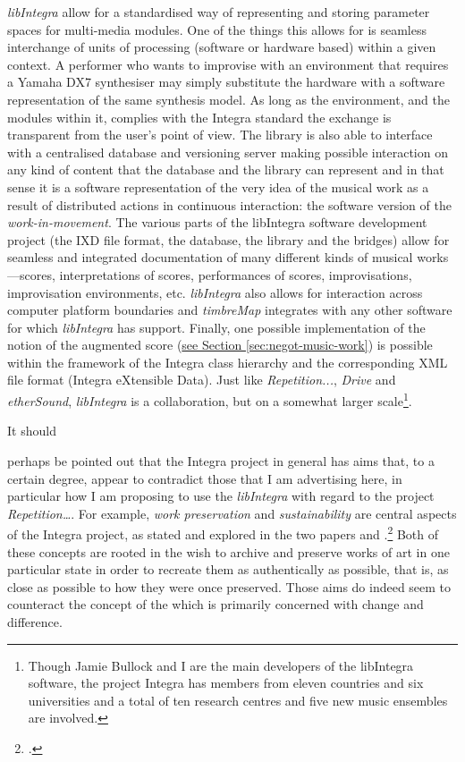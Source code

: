 \emph{libIntegra} allow for a standardised way of representing and storing parameter spaces for multi-media modules.  One of the things this allows for is seamless interchange of units of  processing (software or hardware based) within a given context. A performer who wants to improvise with an environment that requires a Yamaha DX7 synthesiser may simply substitute the hardware with a software representation of the same synthesis model. As long as the environment, and the modules within it, complies with the Integra standard the exchange is transparent from the user's point of view. The library is also able to interface with a centralised database and versioning server making possible interaction on any kind of content that the database and the library can represent and in that sense it is a software representation of the very idea of the musical work as a result of distributed actions in continuous interaction: the software version of the \emph{work-in-movement}. The various parts of the libIntegra software development project (the IXD file format, the database, the library and the bridges) allow for seamless and integrated documentation of many different kinds of musical works---scores, interpretations of scores, performances of scores, improvisations, improvisation environments, etc. \emph{libIntegra} also allows for interaction across computer platform boundaries and \emph{timbreMap} integrates with any other software for which \emph{libIntegra} has support. Finally, one possible implementation of the notion of the augmented score (\hyperref[sec:negot-music-work]{see Section \ref*{sec:negot-music-work}}) is possible within the framework of the Integra class hierarchy and the corresponding XML file format (Integra eXtensible Data). Just like \emph{Repetition...}, \emph{Drive} and \emph{etherSound}, \emph{libIntegra} is a collaboration, but on a somewhat larger scale\footnote{Though Jamie Bullock and I are the main developers of the libIntegra software, the project Integra has members from eleven countries and six universities and a total of ten research centres and five new music ensembles are involved.}.

\hypertarget{sec:target:libintegra-1}{It should} perhaps be pointed out that the Integra project in general has aims that, to a certain degree, appear to contradict those that I am advertising here, in particular how I am proposing to use the \emph{libIntegra} with regard to the project \emph{Repetition\ldots}. For example, \emph{work preservation} and \emph{sustainability} are central aspects of the Integra project, as stated and explored in the two papers  and .\footcite{frisk-bullock08} Both of these concepts are rooted in the wish to archive and preserve works of art in one particular state in order to recreate them  as authentically as possible, that is, as close as possible to how they were once preserved. Those aims do indeed seem to counteract the concept of the  which is primarily concerned with change and difference.

